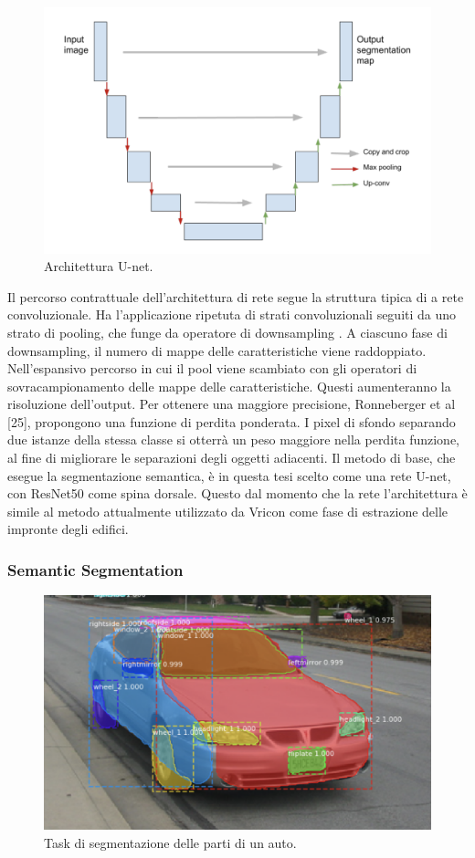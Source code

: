 \begin{figure}[H]
	\centering
	\includegraphics[width = 120mm]{images/unet.png}
	\caption{Architettura U-net.}
	\label{unet}
\end{figure}

Il percorso contrattuale dell'architettura di rete segue la struttura tipica di a rete convoluzionale. Ha l'applicazione ripetuta di strati convoluzionali seguiti da uno strato di pooling, che funge da operatore di downsampling \cite{ronneberger2015u}. A ciascuno fase di downsampling, il numero di mappe delle caratteristiche viene raddoppiato. Nell'espansivo percorso in cui il pool viene scambiato con gli operatori di sovracampionamento delle mappe delle caratteristiche. Questi aumenteranno la risoluzione dell'output. Per ottenere una maggiore precisione, Ronneberger et al [25], propongono una funzione di perdita ponderata. I pixel di sfondo separando due istanze della stessa classe si otterrà un peso maggiore nella perdita funzione, al fine di migliorare le separazioni degli oggetti adiacenti. Il metodo di base, che esegue la segmentazione semantica, è in questa tesi scelto come una rete U-net, con ResNet50 come spina dorsale. Questo dal momento che la rete l'architettura è simile al metodo attualmente utilizzato da Vricon come fase di estrazione delle impronte degli edifici.



\subsubsection{Semantic Segmentation}

\begin{figure}[htb]
	\centering
	\includegraphics[width = 120mm]{images/car_seg.png}
	\caption{Task di segmentazione delle parti di un auto.}
	\label{car_seg}
\end{figure}


